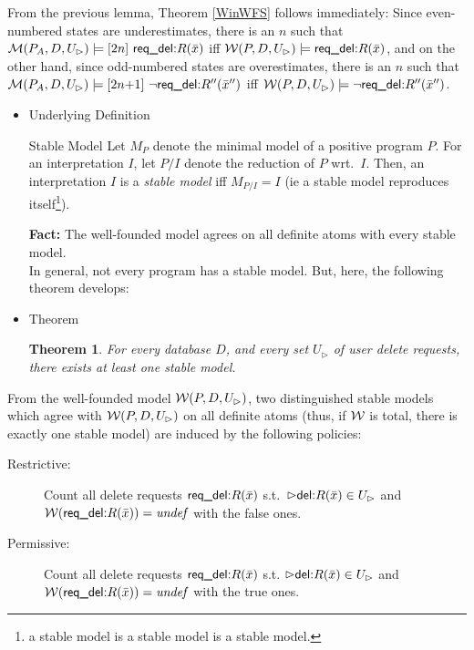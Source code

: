 \documentclass[twoside,11pt]{article}
\newtheorem{Theorem}{Theorem}
\theoremstyle{plain}
\def\rdel{\itorsf{req\_del:}}
\begin{document}
\noindent From the previous lemma, Theorem \ref{WinWFS} follows immediately:
 Since even-numbered states are underestimates,
 there is an $n$ such that
 $\pl M(P_A,D,U_\rhd) \models \sterm{2n}\ \rdel R(\bar x)$ iff
 $\pl W(P,D,U_\rhd) \models \rdel R(\bar x)$, and
 on the other hand, since odd-numbered states are overestimates,
 there is an $n$ such that
 $\pl M(P_A,D,U_\rhd) \models \sterm{2n{+}1}\ \neg \rdel R''(\bar x'')$ iff
 $\pl W(P,D,U_\rhd) \models \neg \rdel R''(\bar x'')$.

\begin{itemize}
\item Underlying Definition
\begin{Definition}{Stable Model}
\cite{gelfond-lifschitz-ICLP-88,bidoit-froidevaux-TCS-91}
Let $M_P$ denote the minimal model of a positive program $P$.
For an interpretation $I$, let $P/I$ denote the reduction of $P$
wrt.\ $I$.
Then, an interpretation $I$ is a \emph{stable model} iff
$M_{P/I} = I$
(ie a stable model reproduces itself\footnote{a stable model is a stable
model is a stable model.}). 
\end{Definition}
\noindent
\textbf{Fact:} The well-founded model agrees on all definite atoms
with every stable model. \\
In general, not every program has a stable model. But, here,
the following theorem develops:

\item Theorem
\begin{Theorem}
For every database $D$, and every set $U_\rhd$ of user delete requests,
there exists at least one stable model.
\end{Theorem}
\end{itemize}

\noindent
From the well-founded model $\mathcal W(P,D,U_\rhd)$, two distinguished
stable models which agree with $\mathcal W(P,D,U_\rhd)$ on all definite
atoms (thus, if $\mathcal W$ is total, there is exactly one stable model)
are induced by the following policies:

\begin{description}
\item[Restrictive:]
  Count all delete requests $\rdel R(\bar x)$ s.t.\
  $\extev \del R(\bar x) \in U_\rhd$ and
  $\pl W(\rdel R(\bar x)) = \undef$ with the false ones.
\item[Permissive:]
  Count all delete requests $\rdel R(\bar x)$ s.t.
  $\extev \del R(\bar x) \in U_\rhd$ and
  $\pl W(\rdel R(\bar x)) = \undef$ with the true ones.
\end{description}
\end{document}
